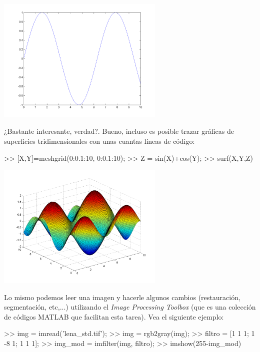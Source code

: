 \begin{center}
\includegraphics[width=0.6\textwidth]{images/ch1/img_1_3.png}
\label{fig:gla1}
\end{center}

¿Bastante interesante, verdad?. Bueno, incluso es posible trazar
gráficas de superficies tridimensionales con unas cuantas líneas de
código:

\begin{matlab}
>> [X,Y]=meshgrid(0:0.1:10, 0:0.1:10);
>> Z = sin(X)+cos(Y);
>> surf(X,Y,Z)
\end{matlab}

\begin{center}
\includegraphics[width=0.6\textwidth]{images/ch1/img_1_4.png}
\label{fig:xxxx}
\end{center}

Lo mismo podemos leer una imagen y hacerle algunos cambios
(restauración, segmentación, etc,...) utilizando el \emph{Image
Processing Toolbox} (que es una colección de códigos MATLAB que
facilitan esta tarea). Vea el siguiente ejemplo:

\begin{matlab}
>> img = imread('lena_std.tif');
>> img = rgb2gray(img);
>> filtro = [1 1 1; 1 -8 1; 1 1 1];
>> img_mod = imfilter(img, filtro);
>> imshow(255-img_mod)
\end{matlab}

